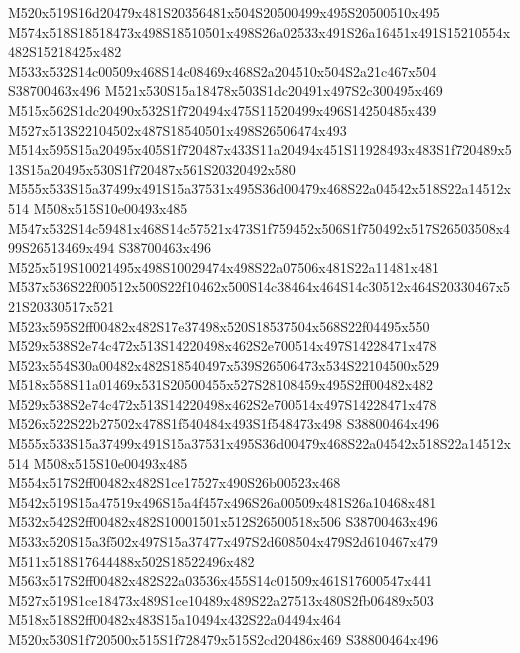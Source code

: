 \documentclass{article}
\begin{document}
\begin{multicols}{2}



M520x519S16d20479x481S20356481x504S20500499x495S20500510x495 M574x518S18518473x498S18510501x498S26a02533x491S26a16451x491S15210554x482S15218425x482 M533x532S14c00509x468S14c08469x468S2a204510x504S2a21c467x504 S38700463x496 M521x530S15a18478x503S1dc20491x497S2c300495x469 M515x562S1dc20490x532S1f720494x475S11520499x496S14250485x439 M527x513S22104502x487S18540501x498S26506474x493 M514x595S15a20495x405S1f720487x433S11a20494x451S11928493x483S1f720489x513S15a20495x530S1f720487x561S20320492x580 M555x533S15a37499x491S15a37531x495S36d00479x468S22a04542x518S22a14512x514 M508x515S10e00493x485 M547x532S14c59481x468S14c57521x473S1f759452x506S1f750492x517S26503508x499S26513469x494 S38700463x496 M525x519S10021495x498S10029474x498S22a07506x481S22a11481x481 M537x536S22f00512x500S22f10462x500S14c38464x464S14c30512x464S20330467x521S20330517x521 M523x595S2ff00482x482S17e37498x520S18537504x568S22f04495x550 M529x538S2e74c472x513S14220498x462S2e700514x497S14228471x478 M523x554S30a00482x482S18540497x539S26506473x534S22104500x529 M518x558S11a01469x531S20500455x527S28108459x495S2ff00482x482 M529x538S2e74c472x513S14220498x462S2e700514x497S14228471x478 M526x522S22b27502x478S1f540484x493S1f548473x498 S38800464x496 M555x533S15a37499x491S15a37531x495S36d00479x468S22a04542x518S22a14512x514 M508x515S10e00493x485 M554x517S2ff00482x482S1ce17527x490S26b00523x468 M542x519S15a47519x496S15a4f457x496S26a00509x481S26a10468x481 M532x542S2ff00482x482S10001501x512S26500518x506 S38700463x496 M533x520S15a3f502x497S15a37477x497S2d608504x479S2d610467x479 M511x518S17644488x502S18522496x482 M563x517S2ff00482x482S22a03536x455S14c01509x461S17600547x441 M527x519S1ce18473x489S1ce10489x489S22a27513x480S2fb06489x503 M518x518S2ff00482x483S15a10494x432S22a04494x464 M520x530S1f720500x515S1f728479x515S2cd20486x469 S38800464x496 



\end{multicols}
\end{document}

